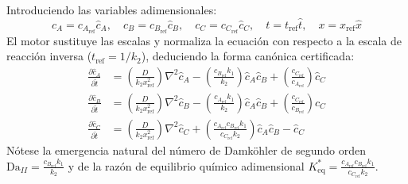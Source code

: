 \documentclass[11pt,a4paper]{article}
\theoremstyle{definition}
\theoremstyle{plain}
\theoremstyle{remark}
\newcommand{\refscale}[1]{#1_{\mathrm{ref}}}
\begin{document}
Introduciendo las variables adimensionales:
\begin{equation}
    c_A = \refscale{c_A} \hat{c}_A, \quad c_B = \refscale{c_B} \hat{c}_B, \quad c_C = \refscale{c_C} \hat{c}_C, \quad t = \refscale{t} \hat{t}, \quad x = \refscale{x} \hat{x}
\end{equation}
El motor sustituye las escalas y normaliza la ecuación con respecto a la escala de reacción inversa ($\refscale{t} = 1/k_2$), deduciendo la forma canónica certificada:
\begin{align}
    \frac{\partial \hat{c}_A}{\partial \hat{t}} &= \left( \frac{D}{k_2 \refscale{x}^2} \right) \nabla^2 \hat{c}_A - \left( \frac{\refscale{c_B} k_1}{k_2} \right) \hat{c}_A \hat{c}_B + \left( \frac{\refscale{c_C}}{\refscale{c_A}} \right) \hat{c}_C \\
    \frac{\partial \hat{c}_B}{\partial \hat{t}} &= \left( \frac{D}{k_2 \refscale{x}^2} \right) \nabla^2 \hat{c}_B - \left( \frac{\refscale{c_A} k_1}{k_2} \right) \hat{c}_A \hat{c}_B + \left( \frac{\refscale{c_C}}{\refscale{c_B}} \right) \hat{c}_C \\
    \frac{\partial \hat{c}_C}{\partial \hat{t}} &= \left( \frac{D}{k_2 \refscale{x}^2} \right) \nabla^2 \hat{c}_C + \left( \frac{\refscale{c_A} \refscale{c_B} k_1}{\refscale{c_C} k_2} \right) \hat{c}_A \hat{c}_B - \hat{c}_C
\end{align}
Nótese la emergencia natural del número de Damköhler de segundo orden $\mathrm{Da}_{II} = \frac{\refscale{c_B} k_1}{k_2}$ y de la razón de equilibrio químico adimensional $K_{\mathrm{eq}}^* = \frac{\refscale{c_A} \refscale{c_B} k_1}{\refscale{c_C} k_2}$.
\end{document}
